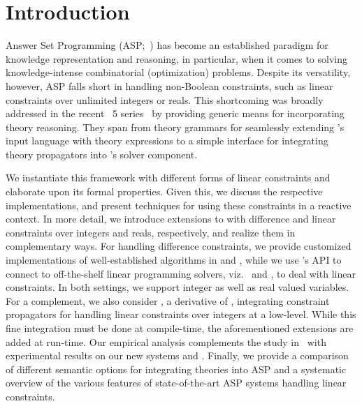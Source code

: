 
\section{Introduction}\label{sec:introduction}

Answer Set Programming (ASP;~\cite{baral02a}) has become an established paradigm for knowledge representation and reasoning,
in particular, when it comes to solving knowledge-intense combinatorial (optimization) problems.
Despite its versatility,
however, ASP falls short in handling non-Boolean constraints, such as linear constraints over unlimited integers or reals.
This shortcoming was broadly addressed in the recent \clingo~5 series~\cite{gekakaosscwa16a} by
providing generic means for incorporating theory reasoning.
They span from theory grammars for seamlessly extending \clingo's input language with theory expressions to 
a simple interface for integrating theory propagators into \clingo's solver component.

We instantiate this framework with different forms of linear constraints and elaborate upon its formal properties.
Given this, we discuss the respective implementations,
and present techniques for using these constraints in a reactive context.
In more detail,
we introduce extensions to \clingo{} with
difference and linear constraints over integers and reals, respectively, 
and realize them in complementary ways.
For handling difference constraints,
we provide customized implementations of well-established algorithms in \python{} and \cpp,
while we use \clingo's \python{} API to connect to off-the-shelf linear programming solvers, viz.\ \cplex{} and \lpsolve,
to deal with linear constraints.
In both settings, we support integer as well as real valued variables.
For a complement, we also consider \clingcon, a derivative of \clingo, 
integrating constraint propagators for handling linear constraints over integers at a low-level.
While this fine integration must be done at compile-time, the aforementioned \python{} extensions are added at run-time.
Our empirical analysis complements the study in~\cite{liesus16a} 
with experimental results on our new systems  and .
Finally, we provide a comparison of different semantic options for integrating theories into ASP
and a systematic overview of the various features of state-of-the-art ASP systems handling linear constraints.

